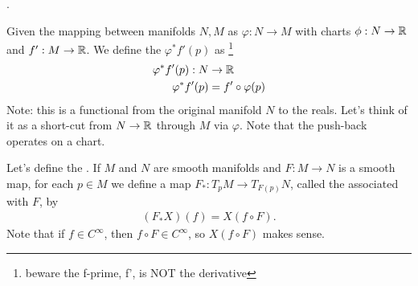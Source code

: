 \documentclass[10pt,a4paper]{report}
\begin{document}
 \begin{definition}.
 
 Given the mapping between manifolds $N,M$ as $\varphi: N \to M$ with charts $\phi: N \to \mathbb{R}$ and $f': M \to \mathbb{R}$.  We define the  $\varphi^*f'(p)$ as \footnote{beware the f-prime, f', is NOT the derivative}
 \begin{align*}
 	\varphi^*f'(p): N &\to \mathbb{R} \\
 	\varphi^*f'(p) &= f'\circ \varphi(p)
 \end{align*}Note: this is a functional from the original manifold $N$ to the reals.  Let's think of it as a short-cut from $N \to \mathbb{R}$ through $M$ via $\varphi$.  Note that the push-back operates on a chart.
 
Let's define the .  If $M$ and $N$ are smooth manifolds and $F:M\to N$ is a smooth map, for each $p \in M$ we define a map $F_*: T_pM\to T_{F(p)}N$, called the  associated with $F$, by 
\begin{align*}
	(F_*X)(f) = X(f\circ F).
\end{align*}Note that if $f \in C^\infty$, then $f\circ F \in C^\infty $, so $X(f\circ F)$ makes sense.
 \end{definition}
 \HLINE
\end{document}
